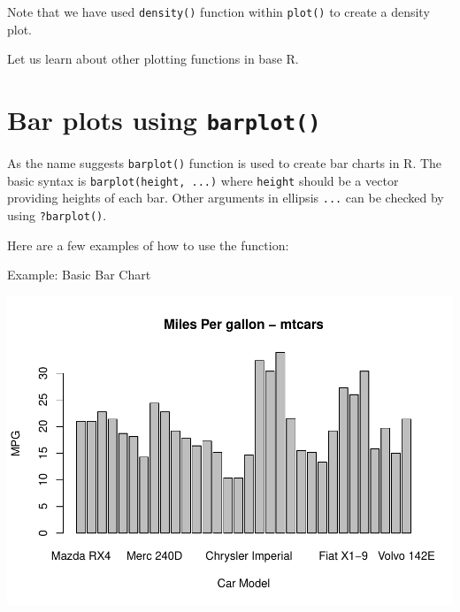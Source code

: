 \documentclass[
]{book}
\newenvironment{Shaded}{\begin{snugshade}}{\end{snugshade}}
\newcommand{\AttributeTok}[1]{\textcolor[rgb]{0.13,0.29,0.53}{#1}}
\newcommand{\CommentTok}[1]{\textcolor[rgb]{0.56,0.35,0.01}{\textit{#1}}}
\newcommand{\FunctionTok}[1]{\textcolor[rgb]{0.13,0.29,0.53}{\textbf{#1}}}
\newcommand{\NormalTok}[1]{#1}
\newcommand{\SpecialCharTok}[1]{\textcolor[rgb]{0.81,0.36,0.00}{\textbf{#1}}}
\newcommand{\StringTok}[1]{\textcolor[rgb]{0.31,0.60,0.02}{#1}}
\begin{document}
Note that we have used \texttt{density()} function within \texttt{plot()} to create a density plot.

Let us learn about other plotting functions in base R.

\hypertarget{bar-plots-using-barplot}{%
\section{\texorpdfstring{Bar plots using \texttt{barplot()}}{Bar plots using barplot()}}\label{bar-plots-using-barplot}}

As the name suggests \texttt{barplot()} function is used to create bar charts in R. The basic syntax is \texttt{barplot(height,\ ...)} where \texttt{height} should be a vector providing heights of each bar. Other arguments in ellipsis \texttt{...} can be checked by using \texttt{?barplot()}.

Here are a few examples of how to use the function:

Example: Basic Bar Chart

\begin{Shaded}
\end{Shaded}

\begin{center}\includegraphics[height=0.55\textheight]{DauR_files/figure-latex/p6-1} \end{center}
\end{document}
